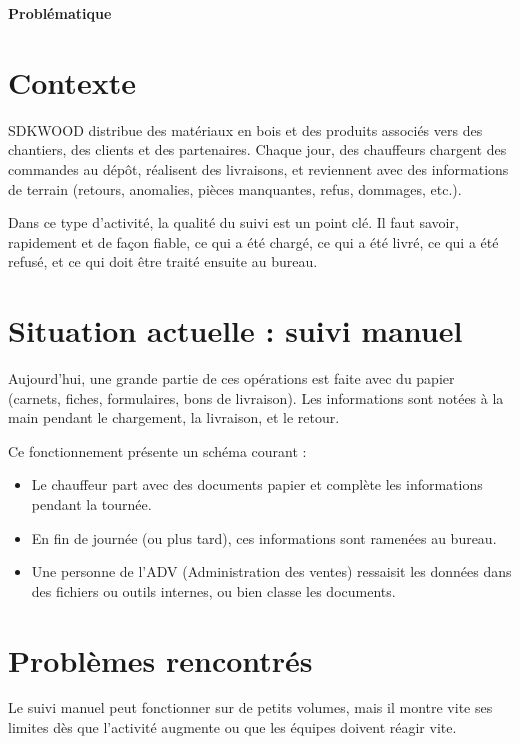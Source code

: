 \documentclass[12pt,a4paper]{article}
\begin{document}
    \begin{center}
    {\LARGE \textbf{Problématique}}\\[0.6em]
    \end{center}

    \section*{Contexte}
    SDKWOOD distribue des matériaux en bois et des produits associés vers des chantiers, des clients et des partenaires. Chaque jour, des chauffeurs chargent des commandes au dépôt, réalisent des livraisons, et reviennent avec des informations de terrain (retours, anomalies, pièces manquantes, refus, dommages, etc.).

    Dans ce type d'activité, la qualité du suivi est un point clé. Il faut savoir, rapidement et de façon fiable, ce qui a été chargé, ce qui a été livré, ce qui a été refusé, et ce qui doit être traité ensuite au bureau.

    \section*{Situation actuelle : suivi manuel}
    Aujourd'hui, une grande partie de ces opérations est faite avec du papier (carnets, fiches, formulaires, bons de livraison). Les informations sont notées à la main pendant le chargement, la livraison, et le retour.

    Ce fonctionnement présente un schéma courant :
    \begin{itemize}[leftmargin=1.2em]
    \item Le chauffeur part avec des documents papier et complète les informations pendant la tournée.
    \item En fin de journée (ou plus tard), ces informations sont ramenées au bureau.
    \item Une personne de l'ADV (Administration des ventes) ressaisit les données dans des fichiers ou outils internes, ou bien classe les documents.
    \end{itemize}

    \section*{Problèmes rencontrés}
    Le suivi manuel peut fonctionner sur de petits volumes, mais il montre vite ses limites dès que l'activité augmente ou que les équipes doivent réagir vite.
\end{document}
